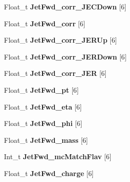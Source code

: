 \begin{DoxyCompactItemize}
\hypertarget{classMiniTree_aa2828daf4fa2fb067bc054cdfe730744}{}\label{classMiniTree_aa2828daf4fa2fb067bc054cdfe730744} 
Float\+\_\+t {\bfseries Jet\+Fwd\+\_\+corr\+\_\+\+J\+E\+C\+Down} \mbox{[}6\mbox{]}
\item 
\hypertarget{classMiniTree_a458e6615c886cd8a0300abbf0f3b185e}{}\label{classMiniTree_a458e6615c886cd8a0300abbf0f3b185e} 
Float\+\_\+t {\bfseries Jet\+Fwd\+\_\+corr} \mbox{[}6\mbox{]}
\item 
\hypertarget{classMiniTree_a4f4713e21941867c96519a015eef7aca}{}\label{classMiniTree_a4f4713e21941867c96519a015eef7aca} 
Float\+\_\+t {\bfseries Jet\+Fwd\+\_\+corr\+\_\+\+J\+E\+R\+Up} \mbox{[}6\mbox{]}
\item 
\hypertarget{classMiniTree_a93d6be47cb34fadeb20d039460706008}{}\label{classMiniTree_a93d6be47cb34fadeb20d039460706008} 
Float\+\_\+t {\bfseries Jet\+Fwd\+\_\+corr\+\_\+\+J\+E\+R\+Down} \mbox{[}6\mbox{]}
\item 
\hypertarget{classMiniTree_a4311470cf63f47ade0d21e6fd0a7b782}{}\label{classMiniTree_a4311470cf63f47ade0d21e6fd0a7b782} 
Float\+\_\+t {\bfseries Jet\+Fwd\+\_\+corr\+\_\+\+J\+ER} \mbox{[}6\mbox{]}
\item 
\hypertarget{classMiniTree_ada8129cd6ff718a5d986cd0f1b873c91}{}\label{classMiniTree_ada8129cd6ff718a5d986cd0f1b873c91} 
Float\+\_\+t {\bfseries Jet\+Fwd\+\_\+pt} \mbox{[}6\mbox{]}
\item 
\hypertarget{classMiniTree_a96add9e4c1dd2b377a201f2715adbc67}{}\label{classMiniTree_a96add9e4c1dd2b377a201f2715adbc67} 
Float\+\_\+t {\bfseries Jet\+Fwd\+\_\+eta} \mbox{[}6\mbox{]}
\item 
\hypertarget{classMiniTree_ab1e1b9f5d7aed578bdb8db7ad814e408}{}\label{classMiniTree_ab1e1b9f5d7aed578bdb8db7ad814e408} 
Float\+\_\+t {\bfseries Jet\+Fwd\+\_\+phi} \mbox{[}6\mbox{]}
\item 
\hypertarget{classMiniTree_abe45cafda6f8ab8cb0245a34a911deba}{}\label{classMiniTree_abe45cafda6f8ab8cb0245a34a911deba} 
Float\+\_\+t {\bfseries Jet\+Fwd\+\_\+mass} \mbox{[}6\mbox{]}
\item 
\hypertarget{classMiniTree_a571e0f19abbccff1a5ce0524314ec56f}{}\label{classMiniTree_a571e0f19abbccff1a5ce0524314ec56f} 
Int\+\_\+t {\bfseries Jet\+Fwd\+\_\+mc\+Match\+Flav} \mbox{[}6\mbox{]}
\item 
\hypertarget{classMiniTree_a8f091c7231390537a7e690e101584d29}{}\label{classMiniTree_a8f091c7231390537a7e690e101584d29} 
Float\+\_\+t {\bfseries Jet\+Fwd\+\_\+charge} \mbox{[}6\mbox{]}
\item 

\end{DoxyCompactItemize}
